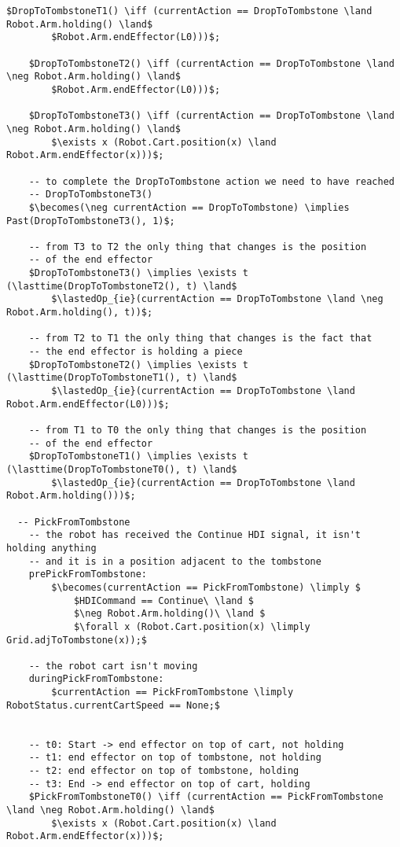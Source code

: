 \begin{lstlisting}[fontadjust, mathescape, frame=single]
    $DropToTombstoneT1() \iff (currentAction == DropToTombstone \land Robot.Arm.holding() \land$
        $Robot.Arm.endEffector(L0)))$;
    
    $DropToTombstoneT2() \iff (currentAction == DropToTombstone \land \neg Robot.Arm.holding() \land$
        $Robot.Arm.endEffector(L0)))$;
    
    $DropToTombstoneT3() \iff (currentAction == DropToTombstone \land \neg Robot.Arm.holding() \land$
        $\exists x (Robot.Cart.position(x) \land Robot.Arm.endEffector(x)))$;
    
    -- to complete the DropToTombstone action we need to have reached
    -- DropToTombstoneT3()
    $\becomes(\neg currentAction == DropToTombstone) \implies Past(DropToTombstoneT3(), 1)$;
    
    -- from T3 to T2 the only thing that changes is the position
    -- of the end effector
    $DropToTombstoneT3() \implies \exists t (\lasttime(DropToTombstoneT2(), t) \land$
        $\lastedOp_{ie}(currentAction == DropToTombstone \land \neg Robot.Arm.holding(), t))$;

    -- from T2 to T1 the only thing that changes is the fact that
    -- the end effector is holding a piece
    $DropToTombstoneT2() \implies \exists t (\lasttime(DropToTombstoneT1(), t) \land$
        $\lastedOp_{ie}(currentAction == DropToTombstone \land Robot.Arm.endEffector(L0)))$;
    
    -- from T1 to T0 the only thing that changes is the position
    -- of the end effector
    $DropToTombstoneT1() \implies \exists t (\lasttime(DropToTombstoneT0(), t) \land$
        $\lastedOp_{ie}(currentAction == DropToTombstone \land Robot.Arm.holding()))$;

  -- PickFromTombstone
    -- the robot has received the Continue HDI signal, it isn't holding anything 
    -- and it is in a position adjacent to the tombstone
    prePickFromTombstone:
        $\becomes(currentAction == PickFromTombstone) \limply $
            $HDICommand == Continue\ \land $
            $\neg Robot.Arm.holding()\ \land $
            $\forall x (Robot.Cart.position(x) \limply Grid.adjToTombstone(x));$

    -- the robot cart isn't moving
    duringPickFromTombstone:
        $currentAction == PickFromTombstone \limply RobotStatus.currentCartSpeed == None;$
        

    -- t0: Start -> end effector on top of cart, not holding
    -- t1: end effector on top of tombstone, not holding
    -- t2: end effector on top of tombstone, holding
    -- t3: End -> end effector on top of cart, holding
    $PickFromTombstoneT0() \iff (currentAction == PickFromTombstone \land \neg Robot.Arm.holding() \land$
        $\exists x (Robot.Cart.position(x) \land Robot.Arm.endEffector(x)))$;
    

\end{lstlisting}
